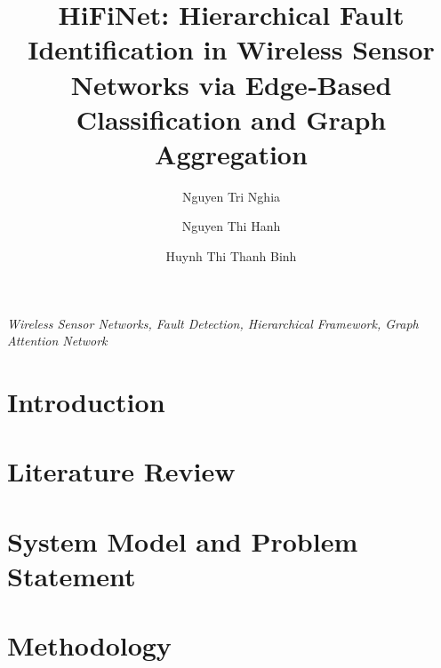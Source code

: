 \documentclass[preprint,12pt]{elsarticle}
\begin{document}
\begin{frontmatter}

\title{HiFiNet: Hierarchical Fault Identification in Wireless Sensor Networks via Edge‑Based Classification and Graph Aggregation}

\author[hust]{Nguyen Tri Nghia}
\author[pnk]{Nguyen Thi Hanh}
\author[hust]{Huynh Thi Thanh Binh}
\address[hust]{Hanoi University of Science and Technology, Vietnam}
\address[pnk]{Faculty of Interdisciplinary Digital Technology (FIDT), PHENIKAA University, Vietnam}



\begin{keyword}
\textit{Wireless Sensor Networks, Fault Detection, Hierarchical Framework, Graph Attention Network}
\end{keyword}

\end{frontmatter}

\section{Introduction}


\section{Literature Review}


\section{System Model and Problem Statement}


\section{Methodology}



\end{document}
